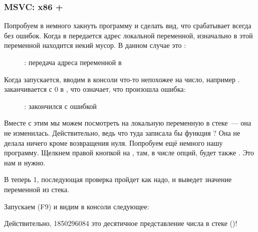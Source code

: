 \clearpage
\subsubsection{MSVC: x86 + \olly}

Попробуем в \olly немного хакнуть программу и сделать вид, что \scanf срабатывает всегда без ошибок.
Когда в \scanf передается адрес локальной переменной, изначально в этой переменной
находится некий мусор. В данном случае это :

\begin{figure}[H]
\centering
{}
\caption{\olly: передача адреса переменной в \scanf}
\label{fig:scanf_ex3_olly_1}
\end{figure}

\clearpage
Когда \scanf запускается, вводим в консоли что-то непохожее на число, например .
\scanf заканчивается с 0 в \EAX, что означает, что произошла ошибка:

\begin{figure}[H]
\centering
{}
\caption{\olly: \scanf закончился с ошибкой}
\label{fig:scanf_ex3_olly_2}
\end{figure}

Вместе с этим мы можем посмотреть на локальную переменную в стеке~--- она не изменилась.
Действительно, ведь что туда записала бы функция \scanf?
Она не делала ничего кроме возвращения нуля.
Попробуем ещё немного  нашу программу.
Щелкнем правой кнопкой на \EAX, там, в числе опций, будет также .
Это нам и нужно.

В \EAX теперь 1, последующая проверка пройдет как надо, и \printf выведет значение переменной из стека.

Запускаем (F9) и видим в консоли следующее:



Действительно, 1850296084 это десятичное представление числа в стеке ()!
